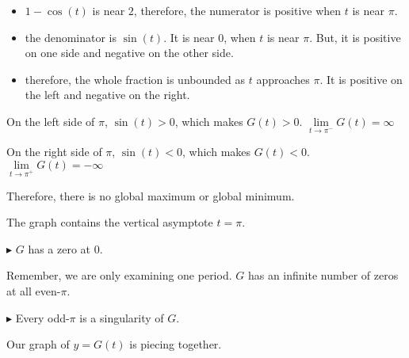 \documentclass{ximera}
\begin{document}
\begin{itemize}
\item $1-\cos(t)$ is near $2$, therefore, the numerator is positive when $t$ is near $\pi$.
\item the denominator is $\sin(t)$. It is near $0$, when $t$ is near $\pi$. But, it is positive on one side and negative on the other side.
\item therefore, the whole fraction is unbounded as $t$ approaches $\pi$.  It is positive on the left and negative on the right.
\end{itemize}




On the left side of $\pi$, $\sin(t) > 0$, which makes $G(t) > 0$.   $\lim\limits_{t \to \pi^{-}}G(t) = \infty$ 

On the right side of $\pi$, $\sin(t) < 0$, which makes $G(t) < 0$.   $\lim\limits_{t \to \pi^{+}}G(t) = -\infty$ 

Therefore, there is no global maximum or global minimum.

The graph contains the vertical asymptote $t=\pi$.



$\blacktriangleright$ $G$ has a zero at $0$.  

Remember, we are only examining one period.  $G$ has an infinite number of zeros at all even-$\pi$.





$\blacktriangleright$ Every odd-$\pi$ is a singularity of $G$.




Our graph of $y=G(t)$ is piecing together.
\end{document}
